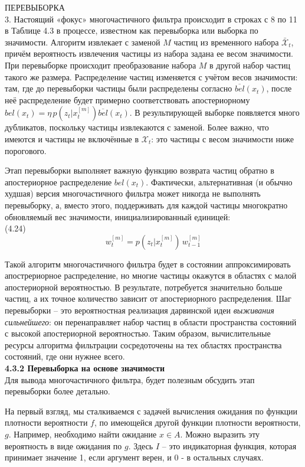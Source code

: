 \documentclass[10pt,a4paper]{article}
\begin{document}
ПЕРЕВЫБОРКА\\
3. Настоящий «фокус» многочастичного фильтра происходит в строках с 8 по 11 в Таблице 4.3 в процессе, известном как перевыборка
или выборка по значимости. Алгоритм извлекает с заменой $M$ частиц из временного набора $\bar{\mathcal X}_t$, причём вероятность извлечения частицы из набора задана ее весом значимости. При перевыборке происходит преобразование набора $M$ в другой набор частиц такого же размера. Распределение частиц изменяется с учётом весов значимости: там, где до перевыборки частицы были распределены согласно $\overline{bel}(x_t)$, после неё распределение будет примерно соответствовать апостериорному
$bel(x_t) =\eta\, p(z_t | x_t^{[m]})\overline{bel}(x_t)$.
В результирующей выборке появляется много дубликатов, поскольку частицы извлекаются с заменой. Более важно, что имеются и частицы не включённые в $\mathcal X_t$: это частицы с весом значимости ниже порогового.

Этап перевыборки выполняет важную функцию возврата частиц обратно в апостериорное распределение $bel(x_t)$. Фактически, альтернативная (и обычно худшая) версия многочастичного фильтра может никогда не выполнять перевыборку, а, вместо этого, поддерживать для каждой частицы многократно обновляемый вес значимости, инициализированный единицей:\\

(4.24)
$$w_t^{[m]}=p(z_t|x_t^{[m]})\,w_{t-1}^{[m]}$$

Такой алгоритм многочастичного фильтра будет в состоянии аппроксимировать апострериорное распределение, но многие частицы окажутся в областях с малой апостериорной вероятностью. 
В результате, потребуется значительно больше частиц, а их точное количество зависит от апостериорного распределения. Шаг перевыборки – это вероятностная реализация дарвинской идеи \textit{выживания сильнейшего}: он перенаправляет набор частиц в области пространства состояний с высокой апостериорной вероятностью. Таким образом, вычислительные ресурсы алгоритма фильтрации сосредоточены на тех областях пространства состояний, где они нужнее всего.\\

\textbf{4.3.2 Перевыборка на основе значимости }\\

Для вывода многочастичного фильтра, будет полезным обсудить этап перевыборки более детально.

На первый взгляд, мы сталкиваемся с задачей вычисления ожидания по функции плотности вероятности $f$, по имеющейся другой функции плотности вероятности, $g$. Например, необходимо найти ожидание $x\in A$. Можно выразить эту вероятность в виде ожидания по $g$. Здесь $I$ – это индикаторная функция, которая принимает значение 1, если аргумент верен, и 0 - в остальных случаях.\\
\end{document}
